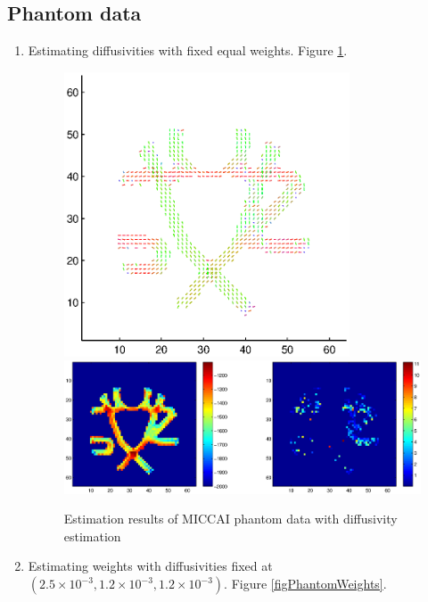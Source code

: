 \documentclass{article}
\begin{document}
\subsection{Phantom data}

\begin{enumerate}
  \item Estimating diffusivities with fixed equal weights. Figure \ref{figPhantomDiffus}.

    \begin{figure}[H]
      \caption{\label{figPhantomDiffus}Estimation results of MICCAI phantom data with diffusivity estimation}
      \centering
      \includegraphics[width=0.8\textwidth]{figures/phantom_diffus.eps}
      \includegraphics[width=\textwidth]{figures/phantom_diffus_like.eps}
    \end{figure}

  \item Estimating weights with diffusivities fixed at $(2.5\times 10^{-3}, 1.2\times 10^{-3}, 1.2\times 10^{-3})$. Figure \ref{figPhantomWeights}.


\end{enumerate}
\end{document}
